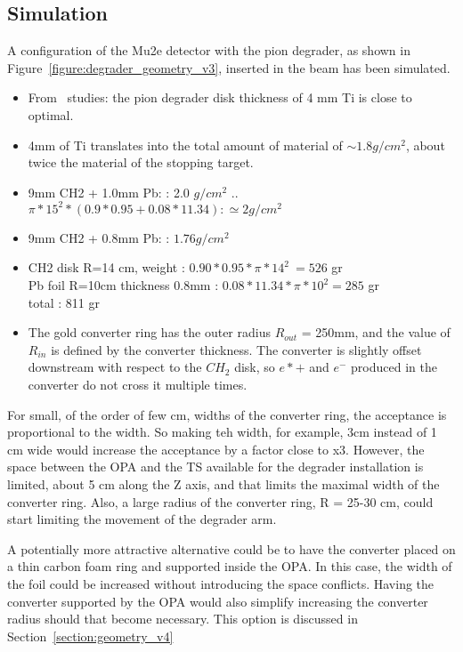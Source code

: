 \subsection{Simulation} 
A configuration of the Mu2e detector with the pion degrader, as shown in  Figure~\ref{figure:degrader_geometry_v3}, inserted in the beam has been simulated.

\begin{itemize}
\item 
  From \piplusenu\ studies: the pion degrader disk thickness of 4 mm Ti is close to optimal.
\item
  4mm of Ti translates into the total amount of material of $\sim 1.8 g/cm^2$,
  about twice the material of the stopping target.
\item
  9mm CH2 + 1.0mm Pb: : 2.0 $g/cm^2$   .. $\pi*15^2*(0.9*0.95 + 0.08*11.34): \simeq 2 g/cm^2$
\item
   9mm CH2 + 0.8mm Pb: : $1.76 g/cm^2$
 \item
   CH2 disk R=14 cm, weight        : $0.90*0.95*\pi*14^2 ~= 526$ gr \\
   Pb  foil R=10cm thickness 0.8mm : $0.08*11.34*\pi*10^2 = 285$ gr \\
   total                           : 811 gr
 \item 
   The gold converter ring has the outer radius $R_{out}$ = 250mm,
   and the value of $R_{in}$ is defined by the converter thickness.
   The converter is slightly offset downstream with respect to the $CH_2$ disk,
   so $e*+$ and $e^-$ produced in the converter do not cross it multiple times.

\end{itemize}

For small, of the order of few cm, widths of the converter ring,
the acceptance is proportional to the width.
So making teh width, for example, 3cm instead of 1 cm wide would increase
the acceptance by a factor close to x3. However, the space between the OPA
and the TS available
for the degrader installation is limited, about 5 cm along the Z axis, 
and that limits the maximal width of the converter ring. Also, a large radius
of the converter ring, R = 25-30 cm, could start limiting the movement of the
degrader arm.

A potentially more attractive alternative could be to have the converter placed
on a thin carbon foam ring and supported inside the OPA. In this case,
the width of the foil could be increased without introducing the space conflicts.
Having the converter supported by the OPA would also simplify increasing
the converter radius should that become necessary.
%
This option is discussed in Section~\ref{section:geometry_v4}


